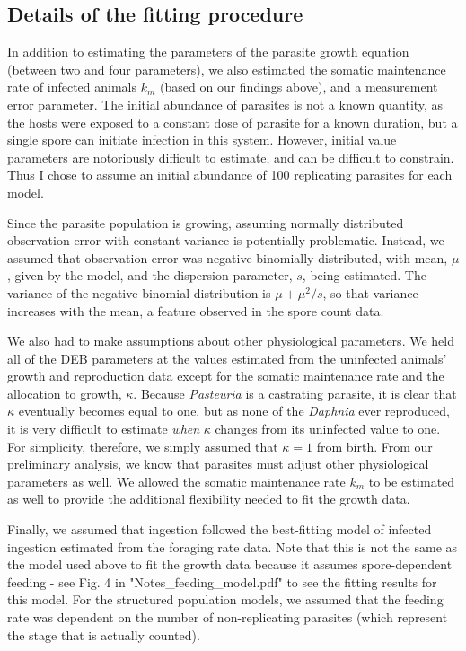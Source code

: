 \documentclass[12pt,reqno,final,pdftex]{amsart}\usepackage[]{graphicx}\usepackage[]{color}
\theoremstyle{plain}
\numberwithin{equation}{part}
\begin{document}

\subsection*{Details of the fitting procedure}
In addition to estimating the parameters of the parasite growth equation (between two and four parameters), we also estimated the somatic maintenance rate of infected animals $k_m$ (based on our findings above), and a measurement error parameter.
The initial abundance of parasites is not a known quantity, as the hosts were exposed to a constant dose of parasite for a known duration, but a single spore can initiate infection in this system.
However, initial value parameters are notoriously difficult to
estimate, and can be difficult to constrain.
Thus I chose to assume an initial abundance of 100 replicating
parasites for each model.

Since the parasite population is growing, assuming normally distributed observation error with constant variance is potentially problematic.
Instead, we assumed that observation error was negative binomially distributed, with mean, $\mu$, given by the model, and the dispersion parameter, $s$, being estimated.
The variance of the negative binomial distribution is $\mu + \mu^2/s$, so that variance increases with the mean, a feature observed in the spore count data.

We also had to make assumptions about other physiological parameters.
We held all of the DEB parameters at the values estimated from the uninfected animals' growth and reproduction data except for the somatic maintenance rate and the allocation to growth, $\kappa$.
Because \emph{Pasteuria} is a castrating parasite, it is clear that $\kappa$ eventually becomes equal to one, but as none of the \emph{Daphnia} ever reproduced, it is very difficult to estimate \emph{when} $\kappa$ changes from its uninfected value to one.
For simplicity, therefore, we simply assumed that $\kappa = 1$ from birth.
From our preliminary analysis, we know that parasites must adjust
other physiological parameters as well.
We allowed the somatic maintenance rate $k_m$ to be estimated as well
to provide the additional flexibility needed to fit the growth data.

Finally, we assumed that ingestion followed the best-fitting model of infected ingestion estimated from the foraging rate data.
Note that this is not the same as the model used above to fit the growth data because it assumes spore-dependent feeding - see Fig. 4 in "Notes\_feeding\_model.pdf" to see the fitting results for this model.
For the structured population models, we assumed that the feeding rate
was dependent on the number of non-replicating parasites (which
represent the stage that is actually counted).
\end{document}
